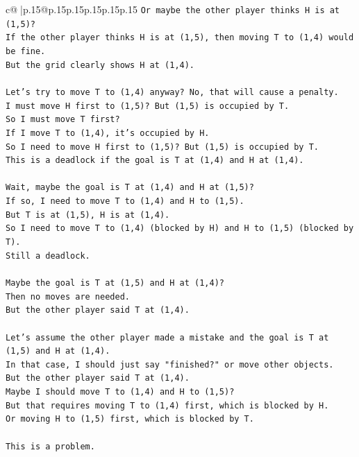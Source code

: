 \documentclass{article}
\begin{document}
{\begin{supertabular}{c@{$\;$}|p{.15\linewidth}@{}p{.15\linewidth}p{.15\linewidth}p{.15\linewidth}p{.15\linewidth}p{.15\linewidth}}
{{{\texttt{Or maybe the other player thinks H is at (1,5)?} \\
\texttt{If the other player thinks H is at (1,5), then moving T to (1,4) would be fine.} \\
\texttt{But the grid clearly shows H at (1,4).} \\
\\ 
\texttt{Let's try to move T to (1,4) anyway? No, that will cause a penalty.} \\
\texttt{I must move H first to (1,5)? But (1,5) is occupied by T.} \\
\texttt{So I must move T first?} \\
\texttt{If I move T to (1,4), it's occupied by H.} \\
\texttt{So I need to move H first to (1,5)? But (1,5) is occupied by T.} \\
\texttt{This is a deadlock if the goal is T at (1,4) and H at (1,4).} \\
\\ 
\texttt{Wait, maybe the goal is T at (1,4) and H at (1,5)?} \\
\texttt{If so, I need to move T to (1,4) and H to (1,5).} \\
\texttt{But T is at (1,5), H is at (1,4).} \\
\texttt{So I need to move T to (1,4) (blocked by H) and H to (1,5) (blocked by T).} \\
\texttt{Still a deadlock.} \\
\\ 
\texttt{Maybe the goal is T at (1,5) and H at (1,4)?} \\
\texttt{Then no moves are needed.} \\
\texttt{But the other player said T at (1,4).} \\
\\ 
\texttt{Let's assume the other player made a mistake and the goal is T at (1,5) and H at (1,4).} \\
\texttt{In that case, I should just say "finished?" or move other objects.} \\
\texttt{But the other player said T at (1,4).} \\
\texttt{Maybe I should move T to (1,4) and H to (1,5)?} \\
\texttt{But that requires moving T to (1,4) first, which is blocked by H.} \\
\texttt{Or moving H to (1,5) first, which is blocked by T.} \\
\\ 
\texttt{This is a problem.} \\
}}}
\end{supertabular}}
\end{document}
